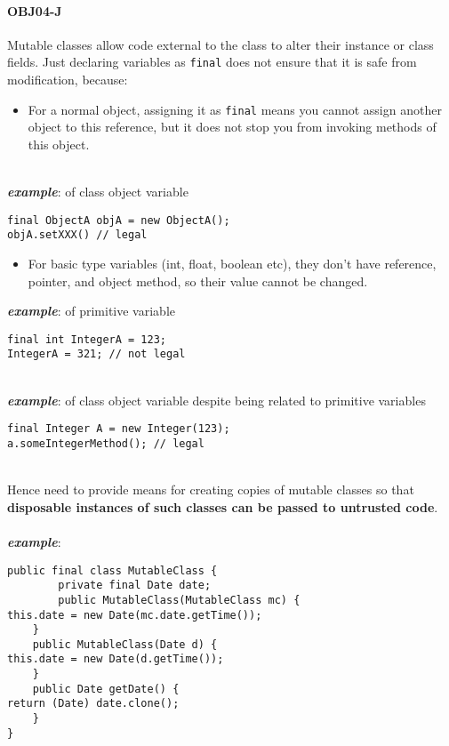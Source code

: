 \documentclass[a4paper]{article}
\begin{document}
\paragraph{OBJ04-J}
Mutable classes allow code external to the class to alter their instance or class fields. Just declaring variables as \texttt{final} does not ensure that it is safe from modification, because:
\begin{itemize}
	\item For a normal object, assigning it as \texttt{final} means you cannot assign another object to this reference, but it does not stop you from invoking methods of this object.
\end{itemize}
\mbox{}\\
\textbf{\textit{example}}: of class object variable
\begin{verbatim}
final ObjectA objA = new ObjectA();
objA.setXXX() // legal
\end{verbatim}
\begin{itemize}
	\item For basic type variables (int, float, boolean etc), they don't have reference, pointer, and object method, so their value cannot be changed.
\end{itemize}
\noindent \textbf{\textit{example}}: of primitive variable
\begin{verbatim}
final int IntegerA = 123;
IntegerA = 321; // not legal
\end{verbatim}
\mbox{}\\
\textbf{\textit{example}}: of class object variable despite being related to primitive variables
\begin{verbatim}
final Integer A = new Integer(123);
a.someIntegerMethod(); // legal
\end{verbatim}
\mbox{}\\
Hence need to provide means for creating copies of mutable classes so that \textbf{disposable instances of such classes can be passed to untrusted code}.\\
\\
\textbf{\textit{example}}: 
\begin{verbatim}
public final class MutableClass {
		private final Date date;
		public MutableClass(MutableClass mc) {
this.date = new Date(mc.date.getTime());
	}
	public MutableClass(Date d) {
this.date = new Date(d.getTime()); 
	}
	public Date getDate() {
return (Date) date.clone(); 
	}
}
\end{verbatim}
\end{document}
